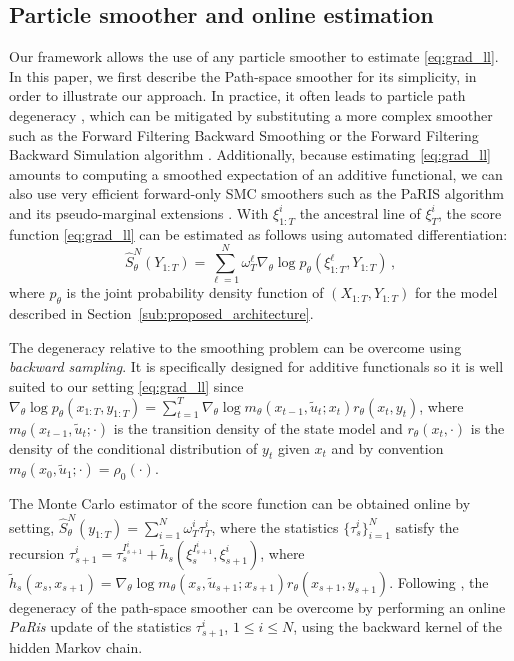 \documentclass[conference]{IEEEtran}
\begin{document}
\subsection{Particle smoother and online estimation}
Our framework allows the use of any particle smoother to estimate \eqref{eq:grad_ll}.
In this paper, we first describe the Path-space smoother \cite{Kitagawa1996} for its simplicity, in order to illustrate our approach.
In practice, it often leads to particle path degeneracy \cite{Andrieu2005}, which can be mitigated by substituting a more complex smoother such as the Forward Filtering Backward Smoothing \cite{Doucet2000OnSM} or the Forward Filtering Backward Simulation algorithm \cite{Godsill2004MonteCS}.
Additionally, because estimating \eqref{eq:grad_ll} amounts to computing a smoothed expectation of an additive functional, we can also use very efficient forward-only SMC smoothers such as the PaRIS algorithm and its pseudo-marginal extensions \cite{Olsson2014EfficientPO,gloaguen2022pseudo}.
With $\xi^i_{1:T}$ the ancestral line of $\xi^i_{T}$, the score function \eqref{eq:grad_ll} can be estimated as follows using automated differentiation:
$$\widehat {S}^N_\theta(Y_{1:T}) = \sum_{\ell=1}^N \omega_T^\ell\nabla_\theta\log p_\theta(\xi^\ell_{1:T}, Y_{1:T})\,,$$
where $p_\theta$ is the joint probability density function of $(X_{1:T}, Y_{1:T})$ for the model described in Section~\ref{sub:proposed_architecture}.


The degeneracy relative to the smoothing problem can be overcome using
\emph{backward sampling}. It is specifically designed for additive functionals so it is well suited to our setting \eqref{eq:grad_ll} since
$\nabla_\theta\log p_\theta(x_{1:T}, y_{1:T}) = \sum_{t=1}^T \nabla_\theta \log m_{\theta}(x_{t-1},\widetilde u_t;x_t)  r_{\theta}(x_{t},y_t)$,
where $m_{\theta}(x_{t-1},\widetilde u_t;\cdot)$ is the transition density of the state model and $r_{\theta}(x_{t},\cdot)$ is the density of the conditional distribution of $y_t$ given $x_t$ and by convention $m_{\theta}(x_{0},\widetilde u_1;\cdot) = \rho_0(\cdot)$.

The Monte Carlo estimator of the score function can be obtained online  by setting,
$	\widehat {S}^N_\theta(y_{1:T}) = \sum_{i = 1}^N \omega_T^i\tau_T^i$,
where the statistics $\{\tau_s^i\}_{i = 1}^N$ satisfy the recursion $\tau_{s + 1}^{i} = \tau_{s}^{I_{s+1}^{i}} + \tilde{h}_s(\xi_{s}^{I_{s+1}^{i}}, \xi_{s + 1}^{i})$,
where $\tilde{h}_s(x_s,x_{s+1}) = \nabla_\theta \log m_{\theta}(x_{s},\widetilde u_{s+1};x_{s+1}) r_{\theta}(x_{s+1},y_{s+1})$.
Following \cite{DelMoral2010,Olsson2014EfficientPO,martin2020backward,gloaguen2022pseudo}, the degeneracy of the path-space smoother can be overcome by performing an online {\it PaRis} update of the statistics $\tau_{s + 1}^{i}$, $1\leq i\leq N$, using the backward kernel of the hidden Markov chain.
\end{document}
